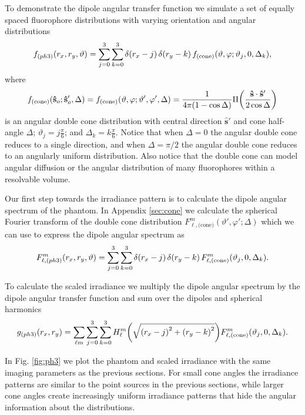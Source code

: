 \documentclass[]{osa-article}
\let\originalleft\left
\let\originalright\right
\renewcommand{\left}{\mathopen{}\mathclose\bgroup\originalleft}
\renewcommand{\right}{\aftergroup\egroup\originalright}
\providecommand{\so}{\mathbf{\hat{s}}_o}
\providecommand{\mh}[1]{\mathbf{\hat{#1}}}
\begin{document}
 To demonstrate the dipole angular transfer function we simulate a set of
 equally spaced fluorophore distributions with varying orientation and angular
 distributions
 \begin{align}
   f_{(ph3)}(r_x, r_y, \vartheta) = \sum_{j=0}^3 \sum_{k=0}^3 \delta\left(r_x - j\right)\, \delta\left(r_y - k\right)\, f_{\text{(cone)}}\left(\vartheta, \varphi; \vartheta_j, 0, \Delta_k\right),\label{eq:phantom3}
 \end{align}
 where
 \begin{align}
   f_{\text{(cone)}}(\so; \so', \Delta) = f_{\text{(cone)}}(\vartheta, \varphi; \vartheta', \varphi', \Delta) = \frac{1}{4\pi(1 - \cos\Delta)}\Pi\left(\frac{\mh{s}\cdot\mh{s}'}{2\cos\Delta}\right)
 \end{align}
 is an angular double cone distribution with central direction $\mh{s}'$ and
 cone half-angle $\Delta$; $\vartheta_j = j\frac{\pi}{6}$; and
 $\Delta_k = k\frac{\pi}{6}$. Notice that when $\Delta = 0$ the angular double
 cone reduces to a single direction, and when $\Delta = \pi/2$ the angular
 double cone reduces to an angularly uniform distribution. Also notice that the
 double cone can model angular diffusion or the angular distribution of many
 fluorophores within a resolvable volume.
 
 Our first step towards the irradiance pattern is to calculate the dipole
 angular spectrum of the phantom. In Appendix \ref{sec:cone} we calculate the
 spherical Fourier transform of the double cone distribution
 $F^m_{\ell,\text{(cone)}}(\vartheta', \varphi'; \Delta)$ which we can use to
 express the dipole angular spectrum as
 \begin{align}
   F^{m}_{\ell,(ph3)}(r_x, r_y, \vartheta) = \sum_{j=0}^3 \sum_{k=0}^3 \delta\left(r_x - j\right)\, \delta\left(r_y - k\right)\, F^m_{\ell,\text{(cone)}}\left(\vartheta_j, 0, \Delta_k\right).\label{eq:phantom3spect}
 \end{align}

 To calculate the scaled irradiance we multiply the dipole angular spectrum
   by the dipole angular transfer function and sum over the dipoles and
   spherical harmonics
 \begin{align}
   g_{(ph3)}(r_x, r_y) = \sum_{\ell m}\sum_{j=0}^3 \sum_{k=0}^3 H_\ell^m\left(\sqrt{\left(r_x - j\right)^2 + \left(r_y - k\right)^2}\right) F^m_{\ell,\text{(cone)}}\left(\vartheta_j, 0, \Delta_k\right).\label{eq:phantom3irr}
 \end{align}

 In Fig. \ref{fig:ph3} we plot the phantom and scaled irradiance with the same
 imaging parameters as the previous sections. For small cone angles the
 irradiance patterns are similar to the point sources in the previous sections,
 while larger cone angles create increasingly uniform irradiance patterns that
 hide the angular information about the distributions.
\end{document}
